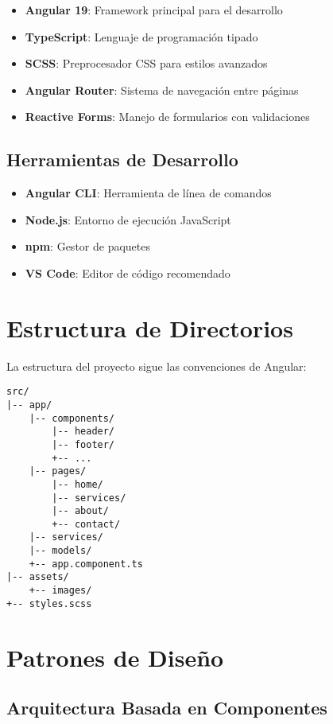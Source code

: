 \begin{itemize}
    \item \textbf{Angular 19}: Framework principal para el desarrollo
    \item \textbf{TypeScript}: Lenguaje de programación tipado
    \item \textbf{SCSS}: Preprocesador CSS para estilos avanzados
    \item \textbf{Angular Router}: Sistema de navegación entre páginas
    \item \textbf{Reactive Forms}: Manejo de formularios con validaciones
\end{itemize}

\subsection{Herramientas de Desarrollo}

\begin{itemize}
    \item \textbf{Angular CLI}: Herramienta de línea de comandos
    \item \textbf{Node.js}: Entorno de ejecución JavaScript
    \item \textbf{npm}: Gestor de paquetes
    \item \textbf{VS Code}: Editor de código recomendado
\end{itemize}

\section{Estructura de Directorios}

La estructura del proyecto sigue las convenciones de Angular:

\begin{verbatim}
src/
|-- app/
    |-- components/
        |-- header/
        |-- footer/
        +-- ...
    |-- pages/
        |-- home/
        |-- services/
        |-- about/
        +-- contact/
    |-- services/
    |-- models/
    +-- app.component.ts
|-- assets/
    +-- images/
+-- styles.scss
\end{verbatim}

\section{Patrones de Diseño}

\subsection{Arquitectura Basada en Componentes}

